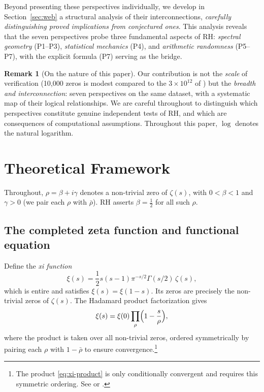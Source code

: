 \documentclass[11pt,a4paper]{article}
\theoremstyle{definition}
\newtheorem{remark}[theorem]{Remark}
\begin{document}
Beyond presenting these perspectives individually, we develop in Section~\ref{sec:web} a structural analysis of their interconnections, \emph{carefully distinguishing proved implications from conjectured ones}. This analysis reveals that the seven perspectives probe three fundamental aspects of RH: \emph{spectral geometry} (P1--P3), \emph{statistical mechanics} (P4), and \emph{arithmetic randomness} (P5--P7), with the explicit formula (P7) serving as the bridge.

\begin{remark}[On the nature of this paper]
Our contribution is not the \emph{scale} of verification (10{,}000 zeros is modest compared to the $3 \times 10^{12}$ of \cite{PlattTrudgian2021}) but the \emph{breadth and interconnection}: seven perspectives on the same dataset, with a systematic map of their logical relationships. We are careful throughout to distinguish which perspectives constitute genuine independent tests of RH, and which are consequences of computational assumptions. Throughout this paper, $\log$ denotes the natural logarithm.
\end{remark}

\section{Theoretical Framework}
\label{sec:theory}

Throughout, $\rho = \beta + i\gamma$ denotes a non-trivial zero of $\zeta(s)$, with $0 < \beta < 1$ and $\gamma > 0$ (we pair each $\rho$ with $\bar{\rho}$). RH asserts $\beta = \tfrac{1}{2}$ for all such $\rho$.

\subsection{The completed zeta function and functional equation}

Define the \emph{xi function}
\begin{equation}\label{eq:xi}
  \xi(s) = \frac{1}{2} s(s-1) \pi^{-s/2} \Gamma(s/2)\, \zeta(s),
\end{equation}
which is entire and satisfies $\xi(s) = \xi(1-s)$. Its zeros are precisely the non-trivial zeros of $\zeta(s)$. The Hadamard product factorization gives
\begin{equation}\label{eq:xi-product}
  \xi(s) = \xi(0) \prod_\rho \Bigl(1 - \frac{s}{\rho}\Bigr),
\end{equation}
where the product is taken over all non-trivial zeros, ordered symmetrically by pairing each $\rho$ with $1 - \bar{\rho}$ to ensure convergence.\footnote{The product \eqref{eq:xi-product} is only conditionally convergent and requires this symmetric ordering. See \cite[Ch.~2]{Edwards1974} or \cite[Ch.~12]{Titchmarsh1986}.}
\end{document}
